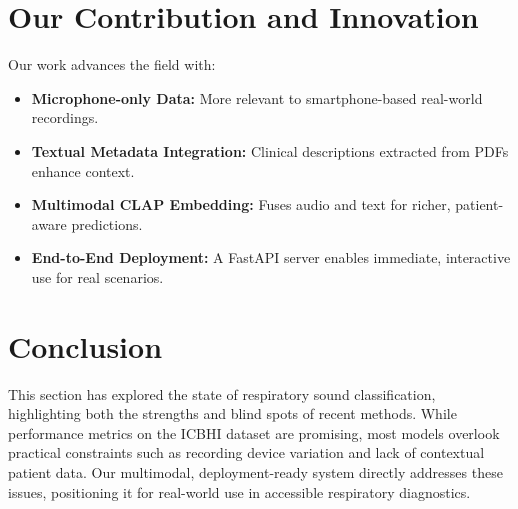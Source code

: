 \section{Our Contribution and Innovation}
Our work advances the field with:
\begin{itemize}
    \item \textbf{Microphone-only Data:} More relevant to smartphone-based real-world recordings.
    \item \textbf{Textual Metadata Integration:} Clinical descriptions extracted from PDFs enhance context.
    \item \textbf{Multimodal CLAP Embedding:} Fuses audio and text for richer, patient-aware predictions.
    \item \textbf{End-to-End Deployment:} A FastAPI server enables immediate, interactive use for real scenarios.
\end{itemize}

\section*{Conclusion}
This section has explored the state of respiratory sound classification, highlighting both the strengths and blind spots of recent methods. While performance metrics on the ICBHI dataset are promising, most models overlook practical constraints such as recording device variation and lack of contextual patient data. Our multimodal, deployment-ready system directly addresses these issues, positioning it for real-world use in accessible respiratory diagnostics.
